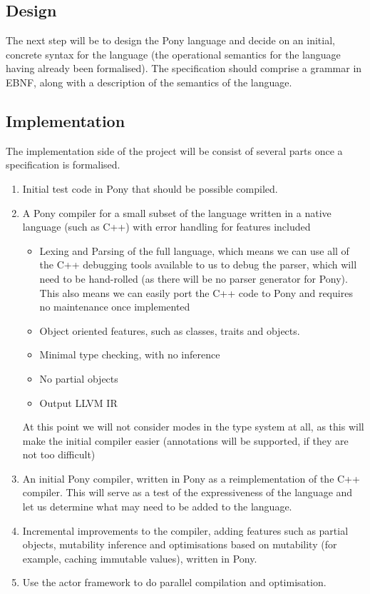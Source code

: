 \documentclass[pdftex,12pt,a4paper]{article}
\begin{document}
\subsection{Design}
The next step will be to design the Pony language and decide on an initial, concrete syntax for the language (the operational semantics for the language having already been formalised).
The specification should comprise a grammar in EBNF, along with a description of the semantics of the language.

\subsection{Implementation}
The implementation side of the project will be consist of several parts once a specification is formalised.

\begin{enumerate}
	\item Initial test code in Pony that should be possible compiled.
	\item A Pony compiler for a small subset of the language written in a native language (such as C++) with error handling for features included
		\begin{itemize}
			\item Lexing and Parsing of the full language, which means we can use all of the C++ debugging tools available to us to debug the parser, which will need to be hand-rolled (as there will be no parser generator for Pony).
				This also means we can easily port the C++ code to Pony and requires no maintenance once implemented
			\item Object oriented features, such as classes, traits and objects.
			\item Minimal type checking, with no inference
			\item No partial objects
			\item Output LLVM IR
		\end{itemize}
	At this point we will not consider modes in the type system at all, as this will make the initial compiler easier (annotations will be supported, if they are not too difficult)
	\item An initial Pony compiler, written in Pony as a reimplementation of the C++ compiler.
		This will serve as a test of the expressiveness of the language and let us determine what may need to be added to the language.
	\item Incremental improvements to the compiler, adding features such as partial objects, mutability inference and optimisations based on mutability (for example, caching immutable values), written in Pony.
    	\item Use the actor framework to do parallel compilation and optimisation.
\end{enumerate}
\end{document}
